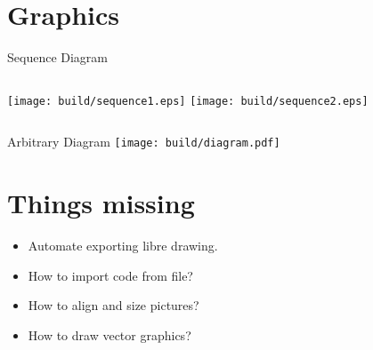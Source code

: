 \documentclass{beamer}
\begin{document}
\section{Graphics}

\begin{frame}{Sequence Diagram}
    \begin{columns}
            \texttt{[image: build/sequence1.eps]}
            \texttt{[image: build/sequence2.eps]}
    \end{columns}
\end{frame}

\begin{frame}{Arbitrary Diagram}
    \texttt{[image: build/diagram.pdf]}
\end{frame}

\section{Things missing}

\begin{frame}
    \begin{itemize}
        \item Automate exporting libre drawing.
        \item How to import code from file?
        \item How to align and size pictures?
        \item How to draw vector graphics?
    \end{itemize}
\end{frame}
\end{document}
